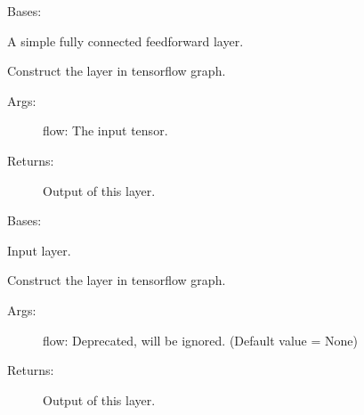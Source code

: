 \documentclass[letterpaper,10pt,english]{sphinxmanual}
\begin{document}

\begin{fulllineitems}
\label{legonet:legonet.layers.FullyConnected}
Bases: {\hyperref[legonet:legonet.layers.Layer]{\emph{}}}

A simple fully connected feedforward layer.

\begin{fulllineitems}
\label{legonet:legonet.layers.FullyConnected.call}
Construct the layer in tensorflow graph.
\begin{description}
\item[{Args:}] \leavevmode
flow: The input tensor.

\item[{Returns:}] \leavevmode
Output of this layer.

\end{description}

\end{fulllineitems}


\end{fulllineitems}


\begin{fulllineitems}
\label{legonet:legonet.layers.Input}
Bases: {\hyperref[legonet:legonet.layers.Layer]{\emph{}}}

Input layer.

\begin{fulllineitems}
\label{legonet:legonet.layers.Input.call}
Construct the layer in tensorflow graph.
\begin{description}
\item[{Args:}] \leavevmode
flow: Deprecated, will be ignored. (Default value = None)

\item[{Returns:}] \leavevmode
Output of this layer.

\end{description}

\end{fulllineitems}


\end{fulllineitems}
\end{document}
